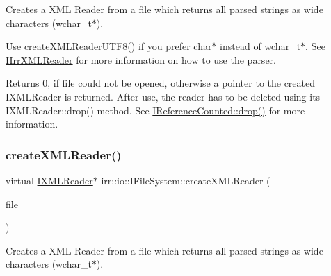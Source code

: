 Creates a X\+ML Reader from a file which returns all parsed strings as wide characters (wchar\+\_\+t$\ast$). 

Use \hyperlink{classirr_1_1io_1_1IFileSystem_affd8f622ac7c3dcd507f20f9cd23b21f}{create\+X\+M\+L\+Reader\+U\+T\+F8()} if you prefer char$\ast$ instead of wchar\+\_\+t$\ast$. See \hyperlink{classirr_1_1io_1_1IIrrXMLReader}{I\+Irr\+X\+M\+L\+Reader} for more information on how to use the parser. \begin{DoxyReturn}{Returns}
0, if file could not be opened, otherwise a pointer to the created I\+X\+M\+L\+Reader is returned. After use, the reader has to be deleted using its I\+X\+M\+L\+Reader\+::drop() method. See \hyperlink{classirr_1_1IReferenceCounted_a03856a09355b89d178090c4a5f738543}{I\+Reference\+Counted\+::drop()} for more information. 
\end{DoxyReturn}
\mbox{\label{classirr_1_1io_1_1IFileSystem_a38f4c90db3fd1b21473ce0cd2437bb59}} 
\subsubsection{\texorpdfstring{create\+X\+M\+L\+Reader()}{createXMLReader()}\hspace{0.1cm}{\footnotesize\ttfamily [3/4]}}
{\footnotesize\ttfamily virtual \hyperlink{namespaceirr_1_1io_ab620b13630f0818f3eefc000f6917fe4}{I\+X\+M\+L\+Reader}$\ast$ irr\+::io\+::\+I\+File\+System\+::create\+X\+M\+L\+Reader (\begin{DoxyParamCaption}\item[{\hyperlink{classirr_1_1io_1_1IReadFile}{I\+Read\+File} $\ast$}]{file }\end{DoxyParamCaption})\hspace{0.3cm}{\ttfamily [pure virtual]}}



Creates a X\+ML Reader from a file which returns all parsed strings as wide characters (wchar\+\_\+t$\ast$). 

